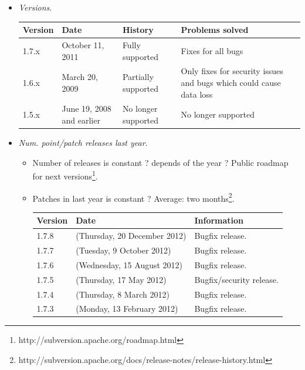 \documentclass[11pt]{scrartcl}
\begin{document}
\begin{itemize}
    \item \emph{Versions}.

        \begin{table}[H]
        \centering
        \begin{tabular}{p{1cm} p{3cm} p{4cm} p{4cm}}
            \hline
                {\bf Version} & {\bf Date} & {\bf History} & {\bf Problems solved}\\
            \hline
                1.7.x & October 11, 2011 & Fully supported & Fixes for all bugs\\
            \hline
                1.6.x & March 20, 2009 & Partially supported & Only fixes for security issues and bugs which could cause data loss\\
            \hline
                1.5.x & June 19, 2008 and earlier & No longer supported & No longer supported\\
            \hline
        \end{tabular}
        \end{table}
    \item \emph{Num. point/patch releases last year}.
    \begin{itemize}
        \item Number of releases is constant ? depends of the year ? Public roadmap for next versions\footnote{http://subversion.apache.org/roadmap.html}.
        \item Patches in last year is constant ? Average: two months\footnote{http://subversion.apache.org/docs/release-notes/release-history.html}.

            \begin{table}[H]
            \centering
            \begin{tabular}{p{1.5cm} p{5.25cm} p{4cm}}
                \hline {\bf Version} & {\bf Date} & {\bf Information}\\
                \hline 1.7.8 & (Thursday, 20 December 2012) & Bugfix release.\\
                \hline 1.7.7 & (Tuesday, 9 October 2012) & Bugfix release.\\
                \hline 1.7.6 & (Wednesday, 15 August 2012) & Bugfix release.\\
                \hline 1.7.5 & (Thursday, 17 May 2012) & Bugfix/security release.\\
                \hline 1.7.4 & (Thursday, 8 March 2012) & Bugfix release.\\
                \hline 1.7.3 & (Monday, 13 February 2012) & Bugfix release.\\
                \hline
            \end{tabular}
            \end{table}
    \end{itemize}
\end{itemize}
\end{document}

